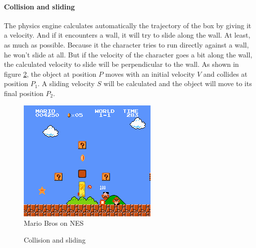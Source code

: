 \documentclass[10pt,a4paper]{article}
\begin{document}
\paragraph{Collision and sliding} The physics engine calculates automatically the trajectory of the box by giving it a velocity. And if it encounters a wall, it will try to slide along the wall. At least, as much as possible. Because it the character tries to run directly against a wall, he won't slide at all. But if the velocity of the character goes a bit along the wall, the calculated velocity to slide  will be perpendicular to the wall. As shown in figure \ref{fig:collision_sliding}, the object at position $P$ moves with an initial velocity $V$ and collides at position $P_1$. A sliding velocity $S$ will be calculated and the object will move to its final position $P_2$.

\begin{figure}[h]
\includegraphics[scale=1]{NES_Super_Mario_Bros.png} 
\caption{Mario Bros on NES}
\label{fig:mario_collision_shape}
\end{figure}

\begin{figure}[h]
\centering
{}
\caption{Collision and sliding}
\label{fig:collision_sliding}
\end{figure}
\end{document}
